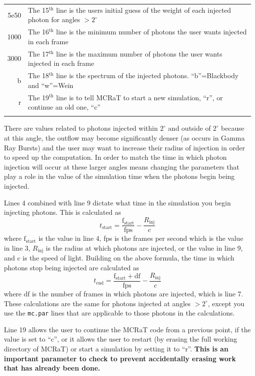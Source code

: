 \documentclass[12pt,a4paper]{article}
\begin{document}
\begin{tabularx}{\linewidth}{r X}
5e50 &    The 15$^\textrm{th}$ line is the users initial guess of the weight of each injected photon for angles $> 2^\circ$\\ 
1000 &   The 16$^\textrm{th}$ line is the minimum number of photons the user wants injected in each frame \\ 
3000 &    The 17$^\textrm{th}$ line is the maximum number of photons the user wants injected in each frame\\ 
b &   The 18$^\textrm{th}$ line is the spectrum of the injected photons. ``b''=Blackbody and ``w''=Wein \\ 
r &    The 19$^\textrm{th}$ line is to tell MCRaT to start a new simulation, ``r'', or continue an old one, ``c'' \\ \newline
\end{tabularx} 

There are values related to photons injected within $2^\circ$ and outside of $2^\circ$ because at this angle, the outflow may become significantly denser (as occurs in Gamma Ray Bursts) and the user may want to increase their radius of injection in order to speed up the computation. In order to match the time in which photon injection will occur at these larger angles means changing the parameters that play a role in the value of the simulation time when the photons begin being injected. 

Lines 4 combined with line 9 dictate what time in the simulation you begin injecting photons. This is calculated as 
\[
t_\mathrm{start}=\frac{\mathrm{f_{start}}}{\mathrm{fps}}-\frac{R_\mathrm{inj}}{c}
\]
where $\mathrm{f_{start}}$ is the value in line 4, fps is the frames per second which is the value in line 3, $R_\mathrm{inj}$ is the radius at which photons are injected, or the value in line 9, and c is the speed of light. Building on the above formula, the time in which photons stop being injected are calculated as
\[
t_\mathrm{end}=\frac{\mathrm{f_{start}}+\mathrm{df}}{\mathrm{fps}}-\frac{R_\mathrm{inj}}{c}
\]
where df is the number of frames in which photons are injected, which is line 7. These calculations are the same for photons injected at angles $> 2^\circ$, except you use the \texttt{mc.par} lines that are applicable to those photons in the calculations. 

Line 19 allows the user to continue the MCRaT code from a previous point, if the value is set to ``c'', or it allows the user to restart (by erasing the full working directory of MCRaT) or start a simulation by setting it to ``r''. {\bf This is an important parameter to check to prevent accidentally erasing work that has already been done.}
\end{document}
